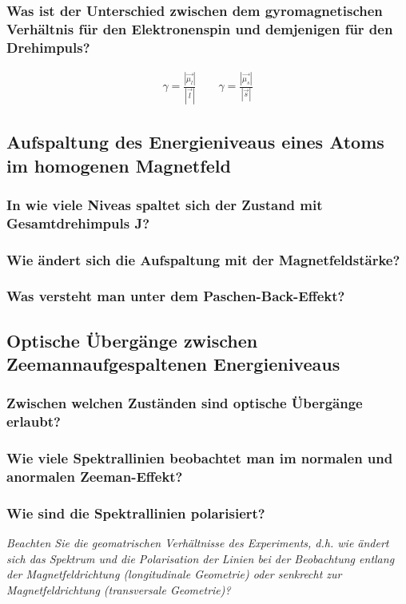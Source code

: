 \subsubsection{Was ist der Unterschied zwischen dem gyromagnetischen Verhältnis für den Elektronenspin und demjenigen für den Drehimpuls?}
\begin{align*}
    \gamma=\frac{|\vec{\mu_l}|}{|\vec{l}|} \qquad
    \gamma=\frac{|\vec{\mu_s}|}{|\vec{s}|}
\end{align*}

\subsection{Aufspaltung des Energieniveaus eines Atoms im homogenen Magnetfeld}

\subsubsection{In wie viele Niveas spaltet sich der Zustand mit Gesamtdrehimpuls J?}
\subsubsection{Wie ändert sich die Aufspaltung mit der Magnetfeldstärke?}
\subsubsection{Was versteht man unter dem Paschen-Back-Effekt?}
\subsection{Optische Übergänge zwischen Zeemannaufgespaltenen Energieniveaus}
\subsubsection{Zwischen welchen Zuständen sind optische Übergänge erlaubt?}
\subsubsection{Wie viele Spektrallinien beobachtet man im normalen und anormalen Zeeman-Effekt?}
\subsubsection{Wie sind die Spektrallinien polarisiert?}
\textit{Beachten Sie die geomatrischen Verhältnisse des Experiments, d.h. wie ändert sich das Spektrum und die Polarisation der Linien
bei der Beobachtung entlang der Magnetfeldrichtung (longitudinale Geometrie) oder senkrecht zur Magnetfeldrichtung (transversale
Geometrie)?}
